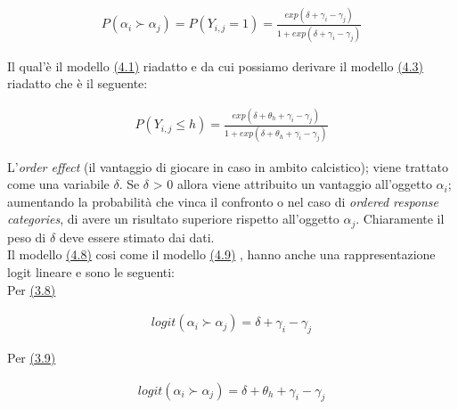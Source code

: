 \begin{align} 
	P(\alpha_{i}\succ \alpha_{j}) = P(Y_{i,j} = 1) = \frac{exp(\delta + \gamma_{i} - \gamma_{j})}{1 + exp(\delta + \gamma_{i} - \gamma_{j})} \label{for:3.8} 
\end{align}

Il qual'è il modello \hyperref[for:3.1]{(4.1)} riadatto e da cui possiamo derivare il modello \hyperref[for:3.2.1]{(4.3)} riadatto che è il seguente:

\begin{align}
	P(Y_{i,j}\leq h) =  \frac{exp(\delta + \theta_{h} + \gamma_{i} - \gamma_{j})}{1 + exp(\delta + \theta_{h} + \gamma_{i} - \gamma_{j})} \label{for:3.9}
\end{align}

L'\emph{order effect} (il vantaggio di giocare in caso in ambito calcistico); viene trattato come una variabile $\delta$. Se $\delta$ > 0 allora viene attribuito un vantaggio all'oggetto $\alpha_{i}$; aumentando la probabilità che vinca il confronto o nel caso di \emph{ordered response categories}, di avere un risultato superiore rispetto all'oggetto $\alpha_{j}$. Chiaramente il peso di $\delta$ deve essere stimato dai dati.\\

Il modello \hyperref[for:3.8]{(4.8)} cosi come il modello \hyperref[for:3.9]{(4.9)} , hanno anche una rappresentazione logit lineare e sono le seguenti:\\

Per \hyperref[for:3.8]{(3.8)}

\begin{align}
	logit(\alpha_{i} \succ \alpha_{j}) =  \delta + \gamma_i - \gamma_j 
\end{align}

Per \hyperref[for:3.9]{(3.9)}

\begin{align}
	logit(\alpha_{i} \succ \alpha_{j}) =  \delta + \theta_{h} + \gamma_i - \gamma_j 
\end{align}
	

